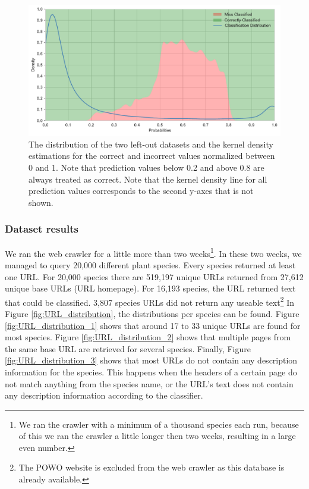 \documentclass[a4paper, 12pt, oneside]{book} %
\begin{document}
\begin{figure}[htpb]
 \centering
 \includegraphics[width=\textwidth]{figures/predictionvalues_external.pdf}
 \caption[Prediction values of left-out datasets]{The distribution of the two left-out datasets and the kernel density estimations for the correct and incorrect values normalized between 0 and 1. Note that prediction values below 0.2 and above 0.8 are always treated as correct. Note that the kernel density line for all prediction values corresponds to the second y-axes that is not shown.}
 \label{fig:predictionvalues_external}
\end{figure}

\subsubsection{Dataset results}
We ran the web crawler for a little more than two weeks\footnote{We ran the crawler with a minimum of a thousand species each run, because of this we ran the crawler a little longer then two weeks, resulting in a large even number.}.
In these two weeks, we managed to query 20,000 different plant species.
Every species returned at least one URL.
For 20,000 species there are 519,197 unique URLs returned from 27,612 unique base URLs (URL homepage).
For 16,193 species, the URL returned text that could be classified.
3,807 species URLs did not return any useable text\footnote{The POWO website is excluded from the web crawler as this database is already available.}
In Figure \ref{fig:URL_distribution}, the distributions per species can be found.
Figure \ref{fig:URL_distribution_1} shows that around 17 to 33 unique URLs are found for most species.
Figure \ref{fig:URL_distribution_2} shows that multiple pages from the same base URL are retrieved for several species.
Finally, Figure \ref{fig:URL_distribution_3} shows that most URLs do not contain any description information for the species.
This happens when the headers of a certain page do not match anything from the species name, or the URL's text does not contain any description information according to the classifier. 
\end{document}
